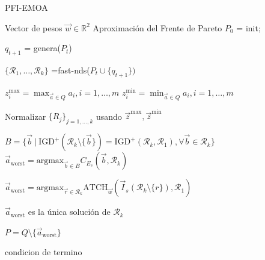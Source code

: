 \begin{algorithm}
    \caption{PFI-EMOA}\label{alg:PFI-EMOA}
    \begin{algorithmic}[1] %
        \Require Vector de pesos $\vec{w}\in \mathbb{R}^2$ 
        \Ensure  Aproximación del Frente de Pareto
        \State $P_0$ = init;

        \Repeat
                
        $q_{t+1}$ = genera($P_t$)
        
        $\{\mathcal{R_1},\ldots,\mathcal{R}_k\}$ =fast-nds($P_t \cup \{q_{t+1}\})$
        

        \State $z_i^{\max} = \max_{\vec{a}\in Q} a_i, i=1,\ldots,m$
        \State $z_i^{\min} = \min_{\vec{a}\in Q} a_i, i=1,\ldots,m$

        Normalizar $\{R_j\}_{j=1,\ldots,k}$ usando $\vec{z}^{\max}, \vec{z}^{\min}$

        \State $B = \{\vec{b} \ |\  \text{IGD}^+(\mathcal{R}_k \setminus \{\vec{b}\})=\text{IGD}^+(\mathcal{R}_k,\mathcal{R}_1), \forall \vec{b} \in \mathcal{R}_k\}$
        $\vec{a}_{\text{worst}}=\text{argmax}_{\vec{b}\in B} C_{E_s}(\vec{b},\mathcal{R}_k)$ 
        \Else 
        
        $\vec{a}_{\text{worst}}=\text{argmax}_{\vec{r}\in \mathcal{R}_k} \text{ATCH}_{\vec{w}}(\vec{I}_s(\mathcal{R}_k \setminus \{r\}),\mathcal{R}_1)$ 
        
        

        \EndIf

            \Else 

            $\vec{a}_{\text{worst}}$ es la única solución de $\mathcal{R}_k$
        \EndIf 

        $P=Q\setminus \{\vec{a}_{\text{worst}}\}$
     
        
        \Until condicion de termino

    \end{algorithmic}
\end{algorithm}

